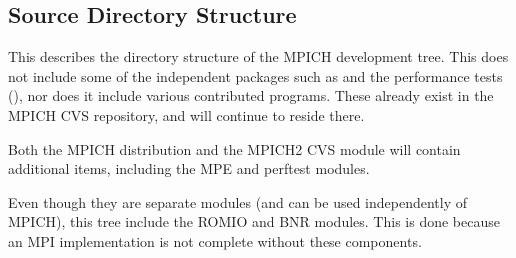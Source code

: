 \documentclass{article}
\begin{document}
\subsection{Source Directory Structure}
\label{sec:dir-structure}
This describes the directory structure of the MPICH development tree. 
This does not include some of the independent packages such as  and
the performance tests (), nor does it include various
contributed programs.  These already exist in the MPICH CVS repository, and
will continue to reside there.

Both the MPICH distribution and the MPICH2 CVS module will contain additional
items, including the MPE and perftest modules.  

Even though they are separate modules (and can be used independently
of MPICH), this tree include the ROMIO and BNR modules.  This is done
because an MPI implementation is not complete without these components.
\end{document}
